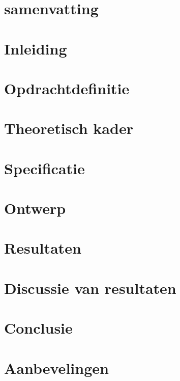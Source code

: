 \documentclass[12pt, a4paper, twoside]{article}
\numberwithin{equation}{section}
\begin{document}
    \makeTitlepage
    \onecolumn

    \section{samenvatting}
    

    \tableofcontents
    \newpage

    \section{Inleiding}
    

    \section{Opdrachtdefinitie} \label{opdracht}
    

    \newpage
    \section{Theoretisch kader} \label{Theorie}
    

    \newpage
    \section{Specificatie}
    

    \newpage
    \section{Ontwerp}
    

    \newpage
    \section{Resultaten}
    

    \newpage
    \section{Discussie van resultaten}
    

    \newpage
    \section{Conclusie}
    

    \newpage
    \section{Aanbevelingen}
    

    \newpage
    \printbibliography

    \newpage
    \appendix
    
\end{document}
